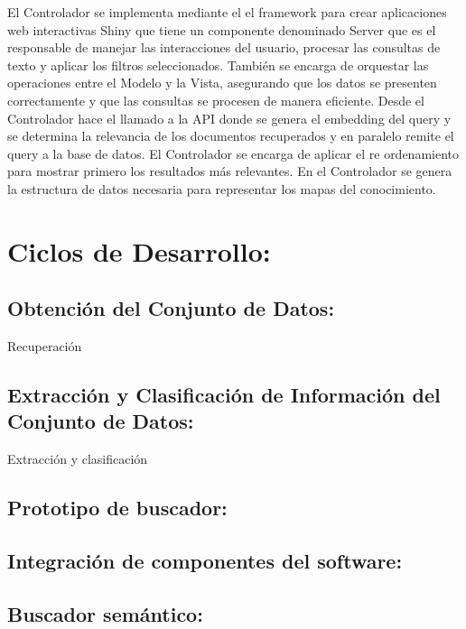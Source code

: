 \documentclass[
  10,
  openany]{book}
\begin{document}
El Controlador se implementa mediante el el framework para crear aplicaciones web interactivas Shiny \citep{shiny} que tiene un componente denominado Server que es el responsable de manejar las interacciones del usuario, procesar las consultas de texto y aplicar los filtros seleccionados. También se encarga de orquestar las operaciones entre el Modelo y la Vista, asegurando que los datos se presenten correctamente y que las consultas se procesen de manera eficiente. Desde el Controlador hace el llamado a la API donde se genera el embedding del query y se determina la relevancia de los documentos recuperados y en paralelo remite el query a la base de datos. El Controlador se encarga de aplicar el re ordenamiento para mostrar primero los resultados más relevantes. En el Controlador se genera la estructura de datos necesaria para representar los mapas del conocimiento.

\hypertarget{desarrollociclos}{%
\section{Ciclos de Desarrollo:}\label{desarrollociclos}}

\hypertarget{desarrollociclos1}{%
\subsection{Obtención del Conjunto de Datos:}\label{desarrollociclos1}}

Recuperación

\hypertarget{desarrollociclos2}{%
\subsection{Extracción y Clasificación de Información del Conjunto de Datos:}\label{desarrollociclos2}}

Extracción y clasificación

\hypertarget{desarrollociclos3}{%
\subsection{Prototipo de buscador:}\label{desarrollociclos3}}

\hypertarget{desarrollociclos4}{%
\subsection{Integración de componentes del software:}\label{desarrollociclos4}}

\hypertarget{desasarrollociclos5}{%
\subsection{Buscador semántico:}\label{desasarrollociclos5}}
\end{document}
